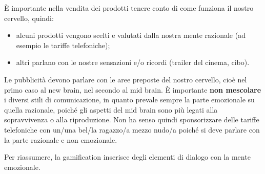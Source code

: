 È importante nella vendita dei prodotti tenere conto di come funziona il nostro
cervello, quindi:

\begin{itemize}
 \item alcuni prodotti vengono scelti e valutati dalla nostra mente razionale
 (ad esempio le tariffe telefoniche);
 \item altri parlano con le nostre sensazioni e/o ricordi (trailer del cinema,
 cibo).
\end{itemize}

Le pubblicità devono parlare con le aree preposte del nostro cervello, cioè nel 
primo caso al new brain, nel secondo al mid brain. È importante \textbf{non 
mescolare} i diversi stili di comunicazione, in quanto prevale sempre la parte 
emozionale su quella razionale, poiché gli aspetti del mid brain sono più 
legati alla sopravvivenza o alla riproduzione. Non ha senso quindi 
sponsorizzare delle tariffe telefoniche con un/una bel/la ragazzo/a mezzo 
nudo/a poiché si deve parlare con la parte razionale e non emozionale.

Per riassumere, la gamification inserisce degli elementi di dialogo
con la mente emozionale.